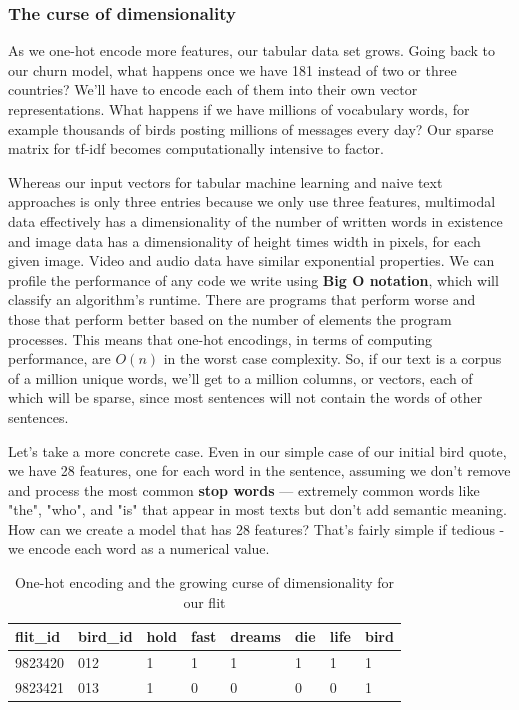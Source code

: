 \documentclass[11pt, table]{diazessay} %
\begin{document}
\begin{sloppypar}
 \subsubsection{The curse of dimensionality}

As we one-hot encode more features, our tabular data set grows. Going back to our churn model,  what happens once we have 181 instead of two or three countries? We'll have to encode each of them  into their own vector representations. What happens if we have millions of vocabulary words, for example thousands of birds posting millions of messages every day? Our sparse matrix for tf-idf becomes computationally intensive to factor.

Whereas our input vectors for tabular machine learning and naive text approaches is only three entries because we only use three features, multimodal data effectively has a dimensionality of the number of written words in existence and image data has a dimensionality of height times width in pixels, for each given image. Video and audio data have similar exponential properties.  We can profile the performance of any code we write using \textbf{Big O notation}, which will classify an algorithm's runtime.  There are programs that perform worse and those that perform better based on the number of elements the program processes. This means that one-hot encodings, in terms of computing performance, are \begin{math}O(n)\end{math} in the worst case complexity. So, if our text is a corpus of a million unique words, we'll get to a million columns, or vectors, each of which will be sparse, since most sentences will not contain the words of other sentences.   

Let's take a more concrete case. Even in our simple case of our initial bird quote, we have 28 features, one for each word in the sentence, assuming we don't remove and process the most common \textbf{stop words} --- extremely common words like "the", "who", and "is" that appear in most texts but don't add semantic meaning.  How can we create a model that has 28 features? That's fairly simple if tedious - we encode each word as a numerical value.

  \begin{table}[H]
    \centering
   	 \caption{One-hot encoding and the growing curse of dimensionality for our flit}
\begin{tabular}{|l|l|l|l|l|l|l|l|}
\hline
\rowcolor[HTML]{D5E7F7}  
flit\_id & bird\_id & hold & fast & dreams & die & life & bird \\ \hline
9823420  & 012  & 1   & 1    & 1 	 & 1  & 1   	 & 1   \\ \hline
9823421  & 013  & 1   & 0    & 0 	 & 0  & 0   	 & 1   \\ \hline
\end{tabular}


\end{table}
\end{sloppypar}
\end{document}
